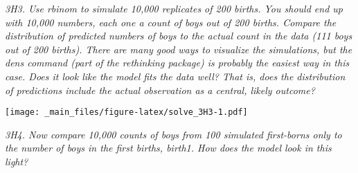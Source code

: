 \documentclass[
]{book}
\newenvironment{Shaded}{\begin{snugshade}}{\end{snugshade}}
\newcommand{\AttributeTok}[1]{\textcolor[rgb]{0.77,0.63,0.00}{#1}}
\newcommand{\ConstantTok}[1]{\textcolor[rgb]{0.00,0.00,0.00}{#1}}
\newcommand{\DecValTok}[1]{\textcolor[rgb]{0.00,0.00,0.81}{#1}}
\newcommand{\FunctionTok}[1]{\textcolor[rgb]{0.00,0.00,0.00}{#1}}
\newcommand{\NormalTok}[1]{#1}
\newcommand{\OtherTok}[1]{\textcolor[rgb]{0.56,0.35,0.01}{#1}}
\newcommand{\SpecialCharTok}[1]{\textcolor[rgb]{0.00,0.00,0.00}{#1}}
\newcommand{\StringTok}[1]{\textcolor[rgb]{0.31,0.60,0.02}{#1}}
\begin{document}
\emph{3H3. Use rbinom to simulate 10,000 replicates of 200 births. You should end up with 10,000 numbers, each one a count of boys out of 200 births. Compare the distribution of predicted numbers of boys to the actual count in the data (111 boys out of 200 births). There are many good ways to visualize the simulations, but the dens command (part of the rethinking package) is probably the easiest way in this case. Does it look like the model fits the data well? That is, does the distribution of predictions include the actual observation as a central, likely outcome?}

\begin{Shaded}
\end{Shaded}

\texttt{[image: \_main\_files/figure-latex/solve\_3H3-1.pdf]}

\emph{3H4. Now compare 10,000 counts of boys from 100 simulated first-borns only to the number of boys in the first births, birth1. How does the model look in this light?}
\end{document}
